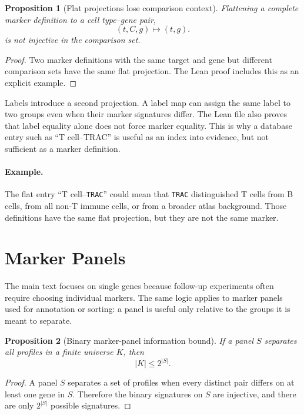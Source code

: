 \documentclass{article}
\newtheorem{proposition}{Proposition}
\begin{document}
\begin{proposition}[Flat projections lose comparison context]\label{prop:flat-projection-loss}
Flattening a complete marker definition to a cell type--gene pair,
\[
  (t,C,g)\mapsto(t,g).
\]
is not injective in the comparison set.
\end{proposition}

\begin{proof}
Two marker definitions with the same target and gene but different comparison sets have the same flat projection. The Lean proof includes this as an explicit example.
\end{proof}

Labels introduce a second projection. A label map can assign the same label to two groups even when their marker signatures differ. The Lean file also proves that label equality alone does not force marker equality. This is why a database entry such as ``T cell--TRAC'' is useful as an index into evidence, but not sufficient as a marker definition.

\paragraph{Example.}
The flat entry ``T cell--\texttt{TRAC}'' could mean that \texttt{TRAC} distinguished T cells from B cells, from all non-T immune cells, or from a broader atlas background. Those definitions have the same flat projection, but they are not the same marker.

\section{Marker Panels}

The main text focuses on single genes because follow-up experiments often require choosing individual markers. The same logic applies to marker panels used for annotation or sorting: a panel is useful only relative to the groups it is meant to separate.

\begin{proposition}[Binary marker-panel information bound]\label{prop:marker-panel-information-bound}
If a panel $S$ separates all profiles in a finite universe $K$, then
\[
  |K|\leq 2^{|S|}.
\]
\end{proposition}

\begin{proof}
A panel $S$ separates a set of profiles when every distinct pair differs on at least one gene in $S$. Therefore the binary signatures on $S$ are injective, and there are only $2^{|S|}$ possible signatures.
\end{proof}
\end{document}
